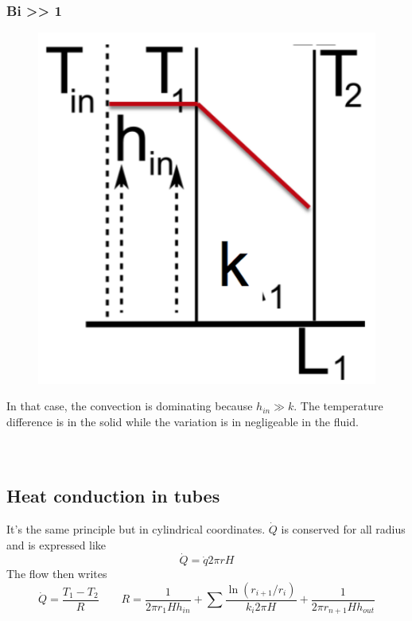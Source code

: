  			 \subsubsection{Bi >> 1}
	 			\begin{figure}
 				\vspace{-5mm}
 				\includegraphics[scale=0.35]{ch3/9}
 				\end{figure}
 				In that case, the convection is dominating because $h_{in} \gg k$. The temperature difference is in the solid while the variation is in negligeable in the fluid. \\\\\\
 			
	\subsection{Heat conduction in tubes}
	It's the same principle but in cylindrical coordinates. $\dot{Q}$ is conserved for all radius and is expressed like 
	\begin{equation}
		\dot{Q} = \dot{q}2\pi r H
		\label{eq:3.18}
	\end{equation}
 	The flow then writes 
 	\begin{equation}
 			\dot{Q} = \frac{T_1-T_2}{R}\qquad R = \frac{1}{2\pi r_1 H h_{in}} + \sum \frac{\ln (r_{i+1}/r_i)}{k_i 2\pi H} + \frac{1}{2 \pi r_{n+1}Hh_{out}}
 	\end{equation}
 	
